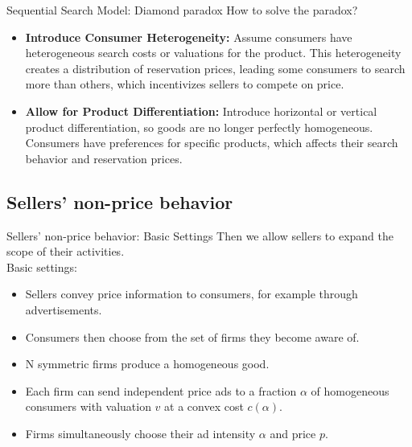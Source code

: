 \documentclass[aspectratio=169]{beamer}  %
\begin{document}
\begin{frame}{Sequential Search Model: Diamond paradox }
    How to solve the paradox?
    \begin{itemize}
        \item \textbf{Introduce Consumer Heterogeneity:} Assume consumers have heterogeneous search costs or valuations for the product. This heterogeneity creates a distribution of reservation prices, leading some consumers to search more than others, which incentivizes sellers to compete on price.
        \item \textbf{Allow for Product Differentiation:} Introduce horizontal or vertical product differentiation, so goods are no longer perfectly homogeneous. Consumers have preferences for specific products, which affects their search behavior and reservation prices.
    \end{itemize}
    
\end{frame}

\subsection{Sellers’ non-price behavior}
\begin{frame}{Sellers’ non-price behavior: Basic Settings}
    Then we allow sellers to expand the scope of their activities.\\
    Basic settings:
    \begin{itemize}
        \item Sellers convey price information to consumers, for example through advertisements.
        \item Consumers then choose from the set of firms they become aware of.
        \item N symmetric firms produce a homogeneous good.
        \item Each firm can send independent price ads to a fraction $\alpha$ of homogeneous consumers with valuation $v$ at a convex cost $c(\alpha)$.
        \item Firms simultaneously choose their ad intensity $\alpha$ and price $p$.
    \end{itemize}
\end{frame}
\end{document}
